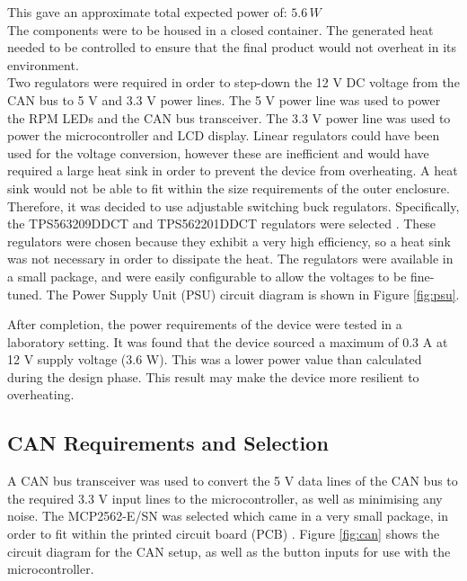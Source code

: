 \documentclass[a4paper,12pt]{article}
\begin{document}
This gave an approximate total expected power of: $5.6\, W$ \\

The components were to be housed in a closed container. The generated heat needed to be controlled to ensure that the final product would not overheat in its environment. \\
 
Two regulators were required in order to step-down the 12 V DC voltage from the CAN bus to 5 V and 3.3 V power lines. The 5 V power line was used to power the RPM LEDs and the CAN bus transceiver. The 3.3 V power line was used to power the microcontroller and LCD display. Linear regulators could have been used for the voltage conversion, however these are inefficient and would have required a large heat sink in order to prevent the device from overheating. A heat sink would not be able to fit within the size requirements of the outer enclosure. Therefore, it was decided to use adjustable switching buck regulators. Specifically, the TPS563209DDCT and TPS562201DDCT regulators were selected \cite{psu_1, psu_2}. These regulators were chosen because they exhibit a very high efficiency, so a heat sink was not necessary in order to dissipate the heat. The regulators were available in a small package, and were easily configurable to allow the voltages to be fine-tuned. The Power Supply Unit (PSU) circuit diagram is shown in Figure \ref{fig:psu}.


 
After completion, the power requirements of the device were tested in a laboratory setting. It was found that the device sourced a maximum of 0.3 A at 12 V supply voltage (3.6 W). This was a lower power value than calculated during the design phase. This result may make the device more resilient to overheating.

\newpage
\subsection{CAN Requirements and Selection}
\label{sec:CAN}

A CAN bus transceiver was used to convert the 5 V data lines of the CAN bus to the required 3.3 V input lines to the microcontroller, as well as minimising any noise. The MCP2562-E/SN was selected which came in a very small package, in order to fit within the printed circuit board (PCB) \cite{can_transciever}. Figure \ref{fig:can} shows the circuit diagram for the CAN setup, as well as the button inputs for use with the microcontroller. 
\end{document}
